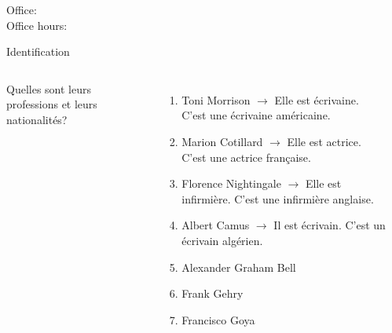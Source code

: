 \documentclass{beamer}
\subtitle[\lexi{C'est} et \lexi{il est}]{\lexi{C'est} et \lexi{il est}}
\begin{document}
  \begin{frame}
    \titlepage
    \tiny{Office: \\
          Office hours: }
  \end{frame}

  \begin{frame}{Identification}
    \begin{columns}
        {\scriptsize
        Quelles sont leurs professions et leurs nationalités?
        \begin{enumerate}
          \item Toni Morrison
           {$\to$ Elle est écrivaine. C'est une écrivaine américaine.}
          \item<3-> Marion Cotillard
           {$\to$ Elle est actrice. C'est une actrice française.}
          \item<5-> Florence Nightingale
           {$\to$ Elle est infirmière. C'est une infirmière anglaise.}
          \item<7-> Albert Camus
           {$\to$ Il est écrivain. C'est un écrivain algérien.}
          \item<9-> Alexander Graham Bell
          \item<11-> Frank Gehry
          \item<13-> Francisco Goya
        \end{enumerate}
        }
        \begin{minipage}[c][0.6\textheight]{\linewidth}
          \begin{center}
          \end{center}
        \end{minipage}
    \end{columns}
  \end{frame}
\end{document}
